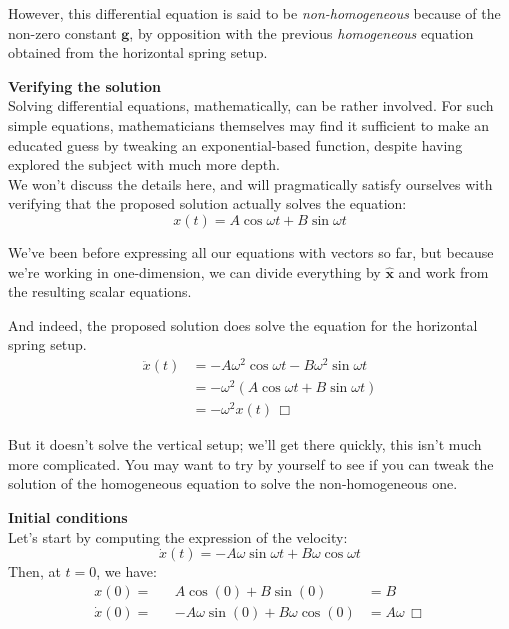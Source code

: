 \documentclass[solutions.tex]{subfiles}
\renewcommand{\bm}[1]{\pmb{#1}}
\renewcommand{\qed}{\,\Box}
\begin{document}
\begin{remark} However, this differential equation is said to be
\textit{non-homogeneous} because of the non-zero constant $\bm{g}$, by
opposition with the previous \textit{homogeneous} equation obtained
from the horizontal spring setup.
\end{remark}
\hr
\textbf{Verifying the solution} \\
Solving differential equations, mathematically, can be rather
involved. For such simple equations, mathematicians themselves
may find it sufficient to make an educated guess by tweaking
an exponential-based function, despite having explored the
subject with much more depth. \\

We won't discuss the details here, and will pragmatically
satisfy ourselves with verifying that the proposed solution actually
solves the equation:
\[x(t) = A\cos\omega t + B\sin\omega t \]
\begin{remark} We've been before expressing all our equations with
vectors so far, but because we're working in one-dimension, we can
divide everything by $\bm{\hat{x}}$ and work from the resulting
scalar equations.
\end{remark}
And indeed, the proposed solution does solve the equation
for the horizontal spring setup.
\begin{align*}
	\ddot x(t) &= -A\omega^2\cos\omega t - B\omega^2\sin\omega t \\
	~ &= -\omega^2 (A\cos\omega t + B\sin\omega t) \\
	~ &= -\omega^2 x(t) \qed
\end{align*}

But it doesn't solve the vertical setup; we'll get there quickly,
this isn't much more complicated. You may want to try by yourself
to see if you can tweak the solution of the homogeneous equation
to solve the non-homogeneous one.

\hr
\textbf{Initial conditions} \\
Let's start by computing the expression of the velocity:
\[ \dot x(t) = -A\omega\sin\omega t + B\omega\cos\omega t \]
Then, at $t=0$, we have:
\begin{equation*} \begin{aligned}
	x(0) = && A\cos(0) + B\sin(0) &= \boxed{B} \\
	\dot x(0) = && -A\omega\sin(0) + B\omega\cos(0) &= \boxed{A\omega}\qed
\end{aligned} \end{equation*}
\end{document}
